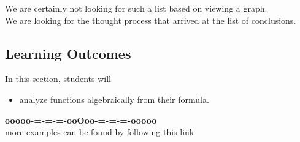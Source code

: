 \documentclass{ximera}
\begin{document}
We are certainly not looking for such a list based on viewing a graph. \\

We are looking for the thought process that arrived at the list of conclusions. \\





\subsection*{Learning Outcomes}


\begin{sectionOutcomes}
In this section, students will 

\begin{itemize}
\item analyze functions algebraically from their formula.
\end{itemize}
\end{sectionOutcomes}


















\begin{center}
\textbf{\textcolor{green!50!black}{ooooo-=-=-=-ooOoo-=-=-=-ooooo}} \\

more examples can be found by following this link\\ 

\end{center}
\end{document}
